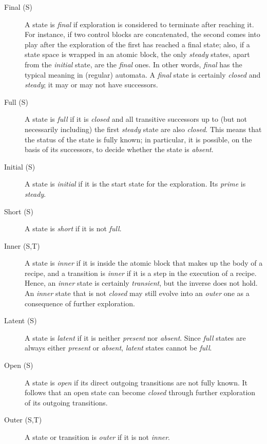 \documentclass{article}
\begin{document}
\begin{description}
\item[Final (S)] A state is \emph{final} if exploration is considered to terminate after reaching it. For instance, if two control blocks are concatenated, the second comes into play after the exploration of the first has reached a final state; also, if a state space is wrapped in an atomic block, the only \emph{steady} states, apart from the \emph{initial} state, are the \emph{final} ones. In other words, \emph{final} has the typical meaning in (regular) automata. A \emph{final} state is certainly \emph{closed} and \emph{steady}; it may or may not have successors.

\item[Full (S)] A state is \emph{full} if it is \emph{closed} and all transitive successors up to (but not necessarily including) the first \emph{steady} state are also \emph{closed}. This means that the status of the state is fully known; in particular, it is possible, on the basis of its successors, to decide whether the state is \emph{absent}.

\item[Initial (S)] A state is \emph{initial} if it is the start state for the exploration. Its \emph{prime} is \emph{steady}.

\item[Short (S)] A state is \emph{short} if it is not \emph{full}.

\item[Inner (S,T)] A state is \emph{inner} if it is inside the atomic block that makes up the body of a recipe, and a transition is \emph{inner} if it is a step in the execution of a recipe. Hence, an \emph{inner} state is certainly \emph{transient}, but the inverse does not hold. An \emph{inner} state that is not \emph{closed} may still evolve into an \emph{outer} one as a consequence of further exploration.

\item[Latent (S)] A state is \emph{latent} if it is neither \emph{present} nor \emph{absent}. Since \emph{full} states are always either \emph{present} or \emph{absent}, \emph{latent} states cannot be \emph{full}.

\item[Open (S)] A state is \emph{open} if its direct outgoing transitions are not fully known. It follows that an open state can become \emph{closed} through further exploration of its outgoing transitions.

\item[Outer (S,T)] A state or transition is \emph{outer} if it is not \emph{inner}.


\end{description}
\end{document}
